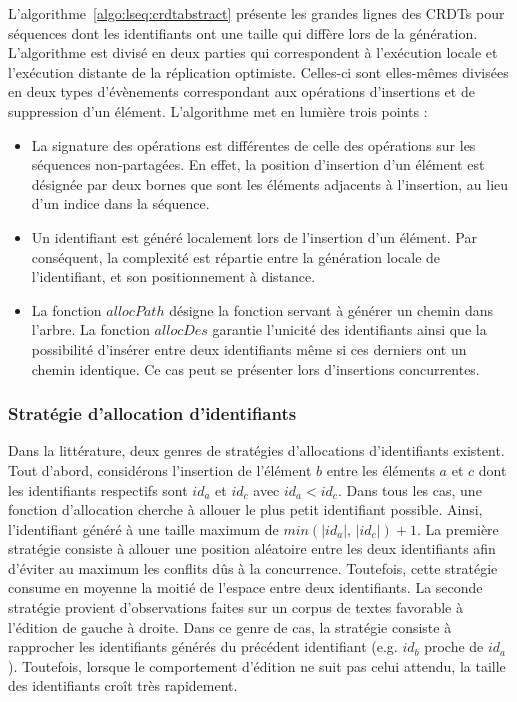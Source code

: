 L'algorithme~\ref{algo:lseq:crdtabstract} présente les grandes lignes des CRDTs pour
séquences dont les identifiants ont une taille qui diffère lors de la
génération. L'algorithme est divisé en deux parties qui correspondent à
l'exécution locale et l'exécution distante de la réplication
optimiste. Celles-ci sont elles-mêmes divisées en deux types d'évènements
correspondant aux opérations d'insertions et de suppression d'un
élément. L'algorithme met en lumière trois points :
\begin{itemize}
\item La signature des opérations est différentes de celle des opérations sur
  les séquences non-partagées. En effet, la position d'insertion d'un élément est
  désignée par deux bornes que sont les éléments adjacents à l'insertion, au lieu
  d'un indice dans la séquence.
\item Un identifiant est généré localement lors de l'insertion d'un élément. Par
  conséquent, la complexité est répartie entre la génération locale de
  l'identifiant, et son positionnement à distance.
\item La fonction $allocPath$ désigne la fonction servant à générer un chemin
  dans l'arbre. La fonction $allocDes$ garantie l'unicité des identifiants ainsi
  que la possibilité d'insérer entre deux identifiants même si ces derniers ont
  un chemin identique.  Ce cas peut se présenter lors d'insertions concurrentes.
\end{itemize}


\subsubsection{Stratégie d'allocation d'identifiants}

Dans la littérature, deux genres de stratégies d'allocations d'identifiants
existent. Tout d'abord, considérons l'insertion de l'élément $b$ entre les
éléments $a$ et $c$ dont les identifiants respectifs sont $id_a$ et $id_c$ avec
$id_a<id_c$. Dans tous les cas, une fonction d'allocation cherche à allouer le
plus petit identifiant possible. Ainsi, l'identifiant généré à une taille
maximum de $min(|id_a|,\, |id_c|)+1$. La première stratégie consiste à allouer
une position aléatoire entre les deux identifiants afin d'éviter au maximum les
conflits dûs à la concurrence. Toutefois, cette stratégie consume en moyenne la
moitié de l'espace entre deux identifiants. La seconde stratégie provient
d'observations faites sur un corpus de textes favorable à l'édition de gauche à
droite. Dans ce genre de cas, la stratégie consiste à rapprocher les
identifiants générés du précédent identifiant (e.g. $id_b$ proche de
$id_a$). Toutefois, lorsque le comportement d'édition ne suit pas celui attendu,
la taille des identifiants croît très rapidement.

